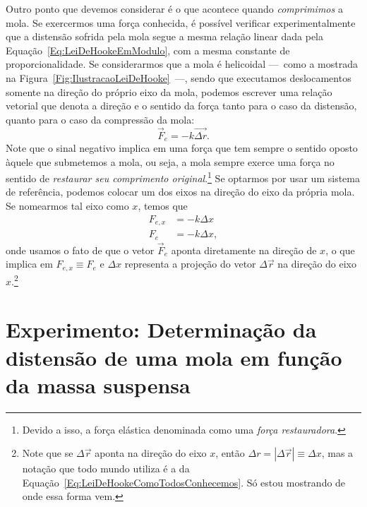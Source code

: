 Outro ponto que devemos considerar é o que acontece quando \emph{comprimimos} a mola. Se exercermos uma força conhecida, é possível verificar experimentalmente que a distensão sofrida pela mola segue a mesma relação linear dada pela Equação~\eqref{Eq:LeiDeHookeEmModulo}, com a mesma constante de proporcionalidade. Se considerarmos que a mola é helicoidal ---~como a mostrada na Figura~\ref{Fig:IlustracaoLeiDeHooke}~---, sendo que executamos deslocamentos somente na direção do próprio eixo da mola, podemos escrever uma relação vetorial que denota a direção e o sentido da força tanto para o caso da distensão, quanto para o caso da compressão da mola:
\begin{equation}
    \vec{F}_e = - k \vec{\Delta r}.
\end{equation}
%
Note que o sinal negativo implica em uma força que tem sempre o sentido oposto àquele que submetemos a mola, ou seja, a mola sempre exerce uma força no sentido de \emph{restaurar seu comprimento original}.\footnote{ Devido a isso, a força elástica denominada como uma \emph{força restauradora}.} Se optarmos por usar um sistema de referência, podemos colocar um dos eixos na direção do eixo da própria mola. Se nomearmos tal eixo como $x$, temos que
\begin{align}
    F_{e,x} &= -k \Delta x \\
    F_e &= -k \Delta x, \label{Eq:LeiDeHookeComoTodosConhecemos}
\end{align}
%
onde usamos o fato de que o vetor $\vec{F}_{e}$ aponta diretamente na direção de $x$, o que implica em $F_{e,x} \equiv F_e$ e $\Delta x$ representa a projeção do vetor $\Delta \vec{r}$ na direção do eixo $x$.\footnote[][-1cm]{Note que se $\Delta \vec{r}$ aponta na direção do eixo $x$, então $\Delta r = |\Delta \vec{r}| \equiv \Delta x$, mas a notação que todo mundo utiliza é a da Equação~\eqref{Eq:LeiDeHookeComoTodosConhecemos}. Só estou mostrando de onde essa forma vem.}


\section{Experimento: Determinação da distensão de uma mola em função da massa suspensa}

